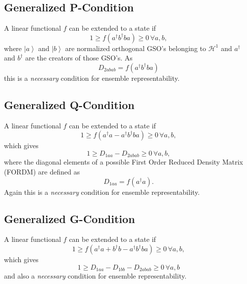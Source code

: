 \documentclass[aps,preprint,amsfonts,amssymb,showpacs,showkeys]{revtex4}%
\begin{document}
\subsection{Generalized P-Condition}

A linear functional $f$ can be extended to a state if
\begin{equation}
1\geq f\left(  a^{\dagger}b^{\dagger}ba\right)  \geq0\,\forall a,b,
\end{equation}
where $\left\vert a\right\rangle $ and $\left\vert b\right\rangle $ are
normalized orthogonal GSO's belonging to $\mathcal{H}^{1}$ and $a^{\dagger}$
and $b^{\dagger}$ are the creators of those GSO's. As
\begin{equation}
D_{2abab}=f\left(  a^{\dagger}b^{\dagger}ba\right)
\end{equation}
this is a \emph{necessary }condition for ensemble representability.

\subsection{Generalized Q-Condition}

A linear functional $f$ can be extended to a state if
\begin{equation}
1\geq f\left(  a^{\dagger}a-a^{\dagger}b^{\dagger}ba\right)  \geq0\,\forall
a,b,
\end{equation}
which gives
\begin{equation}
1\geq D_{1aa}-D_{2abab}\geq0\,\forall a,b, \label{Q1}%
\end{equation}
where the diagonal elements of a possible First Order Reduced Density Matrix
(FORDM) are defined as
\begin{equation}
D_{1aa}=f\left(  a^{\dagger}a\right)  .
\end{equation}
Again this is a \emph{necessary }condition for ensemble representability.

\subsection{Generalized G-Condition}

A linear functional $f$ can be extended to a state if
\begin{equation}
1\geq f\left(  a^{\dagger}a+b^{\dagger}b-a^{\dagger}b^{\dagger}ba\right)
\geq0\,\forall a,b,
\end{equation}
which gives
\begin{equation}
1\geq D_{1aa}-D_{1bb}-D_{2abab}\geq0\,\forall a,b \label{G1}%
\end{equation}
and also a \emph{necessary }condition for ensemble representability.
\end{document}
